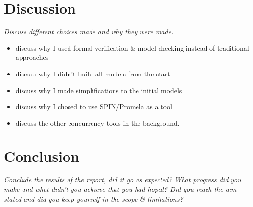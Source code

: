 \chapter{Discussion} 

\textit{Discuss different choices made and why they were made.} \\

\begin{itemize}
\item discuss why I used formal verification \& model checking instead of traditional approaches
\item discuss why I didn't build all models from the start
\item discuss why I made simplifications to the initial models
\item discuss why I chosed to use SPIN/Promela as a tool
\item discuss the other concurrency tools in the background.
\end{itemize}

\chapter{Conclusion}

\textit{Conclude the results of the report, did it go as expected? What progress did you make and what didn't you achieve that you had hoped? Did you reach the aim stated and did you keep yourself in the scope \& limitations? }


